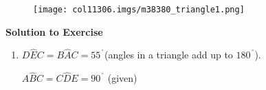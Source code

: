 \begin{table}[H]
{\begin{mdframed}[linewidth=4, leftmargin=40, rightmargin=40]
\begin{exercise}
    \setcounter{subfigure}{0}


	\begin{figure}[H] %
    \begin{center}
   
\label{m38380*id5433!!!underscore!!!media}\label{
m38380*id5433!!!underscore!!!printimage}\texttt{[image: 
col11306.imgs/m38380\_triangle1.png]} %
        
      \vspace{2pt}
    \vspace{.1in}
    
    \end{center}

 \end{figure}   

    \addtocounter{footnote}{-0}
    
  \par 
\vspace{5pt}

\label{m38380*eip-477}\noindent\textbf{Solution to Exercise }
  \label{m38380*eip-156}\begin{enumerate}[noitemsep, label=\textbf{Step}
\textbf{\arabic*}. ] 
            \leftskip=20pt\rightskip=\leftskip\item
\label{m38380*id65234}\begin{math}D\hat{E}C=B\hat{A}C={55}^{\ensuremath{{\,}^{
\circ}}}\end{math}\hspace{1ex}(angles in a triangle add up to 
\begin{math}{180}^{\ensuremath{{\,}^{\circ}}}\end{math}).\par 
     
\label{m38380*id1166232344812}\begin{math}A\hat{B}C=C\hat{D}E={90}^{\ensuremath{
{\,}^{\circ}}}\end{math}\hspace{1ex} (given)\par 
     

\end{enumerate}
\end{exercise}
\end{mdframed}}
\end{table}
